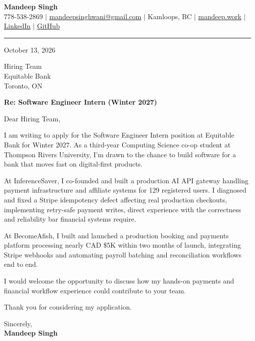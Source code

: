 \documentclass[letterpaper,11pt]{article}
\begin{document}
\begin{center}
    \textbf{\LARGE Mandeep Singh} \\ \vspace{2pt}
    \small 778-538-2869 $|$
    \href{mailto:mandeepsinghwani@gmail.com}{mandeepsinghwani@gmail.com} $|$
    Kamloops, BC $|$
    \href{https://mandeep.work}{mandeep.work} $|$
    \href{https://www.linkedin.com/in/mandeep-singh-b855972a7/}{LinkedIn} $|$
    \href{https://github.com/deepmroot}{GitHub}
\end{center}

\vspace{4pt}
\hrule
\vspace{14pt}

October 13, 2026

\vspace{8pt}
Hiring Team \\
Equitable Bank \\
Toronto, ON

\vspace{8pt}
\textbf{Re: Software Engineer Intern (Winter 2027)}

\vspace{10pt}
Dear Hiring Team,

\vspace{4pt}
I am writing to apply for the Software Engineer Intern position at Equitable Bank for Winter 2027. As a third-year Computing Science co-op student at Thompson Rivers University, I'm drawn to the chance to build software for a bank that moves fast on digital-first products.

At InferenceSaver, I co-founded and built a production AI API gateway handling payment infrastructure and affiliate systems for 129 registered users. I diagnosed and fixed a Stripe idempotency defect affecting real production checkouts, implementing retry-safe payment writes, direct experience with the correctness and reliability bar financial systems require.

At BecomeAfish, I built and launched a production booking and payments platform processing nearly CAD \$5K within two months of launch, integrating Stripe webhooks and automating payroll batching and reconciliation workflows end to end.

I would welcome the opportunity to discuss how my hands-on payments and financial workflow experience could contribute to your team.

Thank you for considering my application.

\vspace{16pt}
Sincerely, \\
\vspace{6pt}
\textbf{Mandeep Singh}
\end{document}
